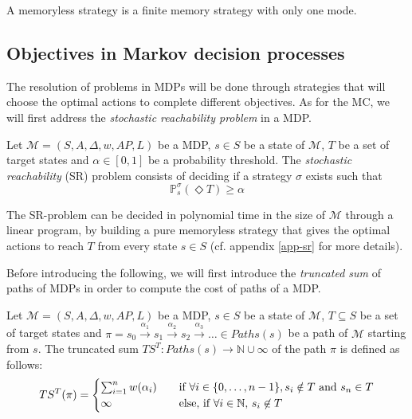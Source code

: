 \begin{property}
  A memoryless strategy is a finite memory strategy with only one mode.
\end{property}

\subsection{Objectives in Markov decision processes}
The resolution of problems in MDPs will be done through strategies that will choose the optimal actions to complete different objectives. As for the MC, we will first address the \textit{stochastic reachability problem} in a MDP.
\begin{definition}
  Let $\mathcal{M}=(S, A, \Delta, w, AP, L)$ be a MDP, $s \in S$ be a state of $\mathcal{M}$, $T$ be a set of target states and $\alpha \in [0, 1]$ be
  a probability threshold. The \textit{stochastic reachability} (SR) problem consists
  of deciding if a strategy $\sigma$ exists such that
  \[
    \mathbb{P}_s^\sigma(\Diamond T) \geq \alpha
  \]
\end{definition}

\begin{theorem}
  The SR-problem can be decided in polynomial time in the size of $\mathcal{M}$
  through a linear program, by building a pure memoryless strategy that gives the optimal actions to reach $T$ from every state $s \in S$ (cf. appendix \ref{app-sr} for more details).
\end{theorem}

Before introducing the following, we will first introduce the \textit{truncated sum} of paths of MDPs in order to compute the cost of paths of a MDP.

\begin{definition}
	Let $\mathcal{M} = (S, A, \Delta, w, AP, L)$ be a MDP, $s \in S$ be a state of $\mathcal{M}$, $T \subseteq S$ be a set of target states and
	$\pi = s_0 \xrightarrow{\alpha_1} s_1 \xrightarrow{\alpha_2} s_2 \xrightarrow{\alpha_3} \dots \in Paths(s)$ be a path of
	$\mathcal{M}$ starting from $s$. The truncated sum $TS^T: Paths(s)
	\rightarrow \mathbb{N} \cup {\infty}$ of the path $\pi$ is defined as follows:
	\[
		TS^T(\pi) =
		\begin{cases}
			\sum_{i = 1}^{n} w(\alpha_i) & \quad \text{if } \forall i \in \{0, \dots, n - 1\}, s_i \notin T \text{ and } s_n \in T \\
			\infty & \quad \text{else, if $ \forall i \in \mathbb{N}, \, s_i \not\in T$}
		\end{cases}
	\]

\end{definition}

